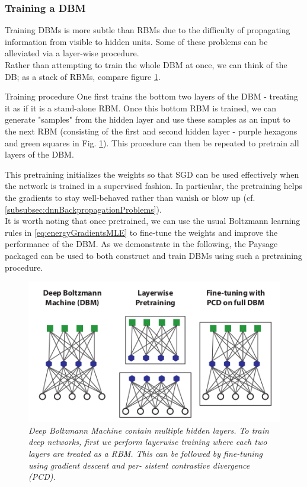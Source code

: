 \subsubsection{Training a DBM}
\label{subsubsec:deepGenerativeDBMTraining}
Training DBMs is more subtle than RBMs due to the difficulty of propagating information from visible to hidden units. Some of these problems can be alleviated via a layer-wise procedure.\\
Rather than attempting to train the whole DBM at once, we can think of the DB; as a stack of RBMs, compare figure \ref{fig:dbm}.
\begin{mybox}{Training procedure}
	One first trains the bottom two layers of the DBM - treating it as if it is a stand-alone RBM. Once this bottom RBM is trained, we can generate "samples" from the hidden layer and use these samples as an input to the next RBM (consisting of the first and second hidden layer - purple hexagons and green squares in Fig. \ref{fig:dbm}). This procedure can then be repeated to pretrain all layers of the DBM.
\end{mybox}
This pretraining initializes the weights so that SGD can be used effectively when the network is trained in a supervised fashion. In particular, the pretraining helps the gradients to stay well-behaved rather than vanish or blow up (cf. \ref{subsubsec:dnnBackpropagationProblems}).\\
It is worth noting that once pretrained, we can use the usual Boltzmann learning rules in \ref{eq:energyGradientsMLE} to fine-tune the weights and improve the performance of the DBM. As we demonstrate in the following, the Paysage packaged can be used to both construct and train DBMs using such a pretraining procedure.





\begin{figure}[h!]
	\centering
	\includegraphics[width=0.7\linewidth]{gfx/DBM}
	\caption{\itshape Deep Boltzmann Machine contain multiple hidden
		layers. To train deep networks, first we perform layerwise
		training where each two layers are treated as a RBM. This
		can be followed by fine-tuning using gradient descent and per-
		sistent contrastive divergence (PCD).}
	\label{fig:dbm}
\end{figure}











